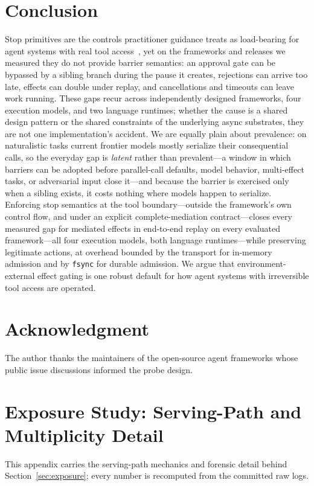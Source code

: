 \documentclass[10pt,journal,compsoc]{IEEEtran}
\begin{document}
\section{Conclusion}
Stop primitives are the controls practitioner guidance treats as load-bearing
for agent systems with real tool
access~\cite{abstractalg26,lgdocs26}, yet on the frameworks and releases we
measured they do not provide barrier semantics: an approval gate
can be bypassed by a sibling branch during the pause it creates, rejections can
arrive too late, effects can double under replay, and cancellations and timeouts
can leave work running. These gaps recur across independently designed
frameworks, four execution models, and two language runtimes; whether the cause
is a shared design pattern or the shared constraints of the underlying async
substrates, they are not one implementation's accident. We are equally plain
about prevalence: on naturalistic tasks current frontier models mostly
serialize their consequential calls, so the everyday gap is \emph{latent}
rather than prevalent---a window in which barriers can be adopted before
parallel-call defaults, model behavior, multi-effect tasks, or adversarial
input close it---and because the barrier is exercised only when a sibling
exists, it costs nothing where models happen to serialize. Enforcing stop
semantics at the tool boundary---outside the framework's own control flow, and
under an explicit complete-mediation contract---closes every measured
gap for mediated effects in end-to-end replay on every evaluated
framework---all four execution models, both language runtimes---while
preserving legitimate actions, at overhead
bounded by the transport for in-memory admission and by \texttt{fsync} for
durable admission. We argue that
environment-external effect gating is one robust default for how agent
systems with irreversible tool access are operated.

\section*{Acknowledgment}
The author thanks the maintainers of the open-source agent frameworks whose
public issue discussions informed the probe design.

\clearpage
\appendices
\section{Exposure Study: Serving-Path and Multiplicity Detail}
\label{app:exposure}
This appendix carries the serving-path mechanics and forensic detail behind
Section~\ref{sec:exposure}; every number is recomputed from the committed
raw logs.
\end{document}
